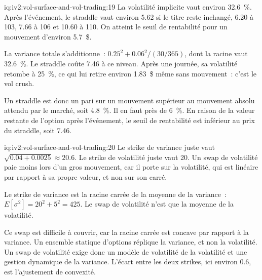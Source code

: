 \begin{solution}{iq:iv2:vol-surface-and-vol-trading:19}
La volatilité implicite vaut environ 32.6~\%. Après l'événement, le straddle vaut environ 5.62 si le titre reste inchangé, 6.20 à 103, 7.66 à 106 et 10.60 à 110. On atteint le seuil de rentabilité pour un mouvement d'environ 5.7~\$.

La variance totale s'additionne~: $0.25^2 + 0.06^2/(30/365)$, dont la racine vaut 32.6~\%. Le straddle coûte 7.46 à ce niveau. Après une journée, sa volatilité retombe à 25~\%, ce qui lui retire environ 1.83~\$ même sans mouvement~: c'est le vol crush.

Un straddle est donc un pari sur un mouvement supérieur au mouvement absolu attendu par le marché, soit 4.8~\%. Il en faut près de 6~\%. En raison de la valeur restante de l'option après l'événement, le seuil de rentabilité est inférieur au prix du straddle, soit 7.46.

\end{solution}

\begin{solution}{iq:iv2:vol-surface-and-vol-trading:20}
Le strike de variance juste vaut $\sqrt{0.04 + 0.0025} \approx 20.6$. Le strike de volatilité juste vaut 20. Un swap de volatilité paie moins lors d'un gros mouvement, car il porte sur la volatilité, qui est linéaire par rapport à sa propre valeur, et non sur son carré.

Le strike de variance est la racine carrée de la moyenne de la variance~: $E[\sigma^2] = 20^2 + 5^2 = 425$. Le swap de volatilité n'est que la moyenne de la volatilité.

Ce swap est difficile à couvrir, car la racine carrée est concave par rapport à la variance. Un ensemble statique d'options réplique la variance, et non la volatilité. Un swap de volatilité exige donc un modèle de volatilité de la volatilité et une gestion dynamique de la variance. L'écart entre les deux strikes, ici environ 0.6, est l'ajustement de convexité.

\end{solution}

